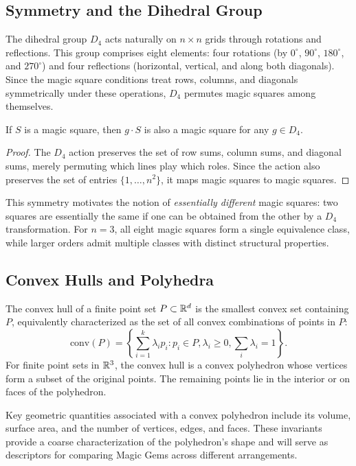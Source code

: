 \subsection{Symmetry and the Dihedral Group}

The dihedral group $D_4$ acts naturally on $n \times n$ grids through rotations and reflections.
This group comprises eight elements: four rotations (by $0^\circ$, $90^\circ$, $180^\circ$, and $270^\circ$) 
and four reflections (horizontal, vertical, and along both diagonals).
Since the magic square conditions treat rows, columns, and diagonals symmetrically 
under these operations, $D_4$ permutes magic squares among themselves.

\begin{proposition}
If $S$ is a magic square, then $g \cdot S$ is also a magic square for any $g \in D_4$.
\end{proposition}

\begin{proof}
The $D_4$ action preserves the set of row sums, column sums, and diagonal sums,
merely permuting which lines play which roles.
Since the action also preserves the set of entries $\{1, \ldots, n^2\}$,
it maps magic squares to magic squares.
\end{proof}

This symmetry motivates the notion of \emph{essentially different} magic squares:
two squares are essentially the same if one can be obtained from the other by a $D_4$ transformation.
For $n = 3$, all eight magic squares form a single equivalence class,
while larger orders admit multiple classes with distinct structural properties.

\subsection{Convex Hulls and Polyhedra}

The convex hull of a finite point set $P \subset \mathbb{R}^d$ is the smallest convex set containing $P$,
equivalently characterized as the set of all convex combinations of points in $P$:
\[
\text{conv}(P) = \left\{ \sum_{i=1}^{k} \lambda_i p_i : p_i \in P, \lambda_i \geq 0, \sum_i \lambda_i = 1 \right\}.
\]
For finite point sets in $\mathbb{R}^3$, the convex hull is a convex polyhedron 
whose vertices form a subset of the original points.
The remaining points lie in the interior or on faces of the polyhedron.

Key geometric quantities associated with a convex polyhedron include its volume, 
surface area, and the number of vertices, edges, and faces.
These invariants provide a coarse characterization of the polyhedron's shape
and will serve as descriptors for comparing Magic Gems across different arrangements.

